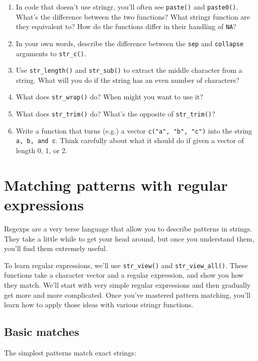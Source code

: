 \documentclass[]{book}
\begin{document}
\begin{enumerate}
\def\labelenumi{\arabic{enumi}.}
\item
  In code that doesn't use stringr, you'll often see \texttt{paste()}
  and \texttt{paste0()}. What's the difference between the two
  functions? What stringr function are they equivalent to? How do the
  functions differ in their handling of \texttt{NA}?
\item
  In your own words, describe the difference between the \texttt{sep}
  and \texttt{collapse} arguments to \texttt{str\_c()}.
\item
  Use \texttt{str\_length()} and \texttt{str\_sub()} to extract the
  middle character from a string. What will you do if the string has an
  even number of characters?
\item
  What does \texttt{str\_wrap()} do? When might you want to use it?
\item
  What does \texttt{str\_trim()} do? What's the opposite of
  \texttt{str\_trim()}?
\item
  Write a function that turns (e.g.) a vector
  \texttt{c("a",\ "b",\ "c")} into the string \texttt{a,\ b,\ and\ c}.
  Think carefully about what it should do if given a vector of length 0,
  1, or 2.
\end{enumerate}

\section{Matching patterns with regular
expressions}\label{matching-patterns-with-regular-expressions}

Regexps are a very terse language that allow you to describe patterns in
strings. They take a little while to get your head around, but once you
understand them, you'll find them extremely useful.

To learn regular expressions, we'll use \texttt{str\_view()} and
\texttt{str\_view\_all()}. These functions take a character vector and a
regular expression, and show you how they match. We'll start with very
simple regular expressions and then gradually get more and more
complicated. Once you've mastered pattern matching, you'll learn how to
apply those ideas with various stringr functions.

\subsection{Basic matches}\label{basic-matches}

The simplest patterns match exact strings:
\end{document}
